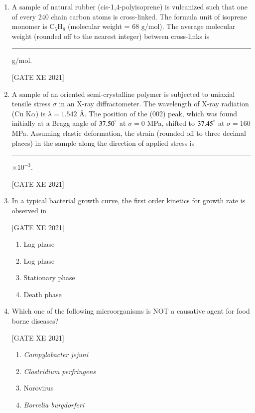 \documentclass[journal,12pt,onecolumn]{IEEEtran}
\theoremstyle{remark}
\begin{document}
\begin{enumerate}[resume]
\hfill[GATE XE 2021]


\item A sample of natural rubber (cis-1,4-polyisoprene) is vulcanized such that one of every 240 chain carbon atoms is cross-linked. The formula unit of isoprene monomer is C$_5$H$_8$ (molecular weight = 68 g/mol). The average molecular weight (rounded off to the nearest integer) between cross-links is \rule{3cm}{0.15mm} g/mol.

\hfill[GATE XE 2021]


\item A sample of an oriented semi-crystalline polymer is subjected to uniaxial tensile stress $\sigma$ in an X-ray diffractometer. The wavelength of X-ray radiation (Cu K$\alpha$) is $\lambda=1.542$ Å. The position of the (002) peak, which was found initially at a Bragg angle of $37.50^\degree$ at $\sigma=0$ MPa, shifted to $37.45^\degree$ at $\sigma=160$ MPa. Assuming elastic deformation, the strain (rounded off to three decimal places) in the sample along the direction of applied stress is \rule{3cm}{0.15mm} $\times10^{-3}$.

\hfill[GATE XE 2021]

\item In a typical bacterial growth curve, the first order kinetics for growth rate is observed in

\hfill[GATE XE 2021]

\begin{multicols}{2}
\begin{enumerate}
\item Lag phase
\item Log phase
\item Stationary phase
\item Death phase
\end{enumerate}
\end{multicols}


\item Which one of the following microorganisms is NOT a causative agent for food borne diseases?

\hfill[GATE XE 2021]

\begin{multicols}{2}
\begin{enumerate}
\item \textit{Campylobacter jejuni}
\item \textit{Clostridium perfringens}
\item Norovirus
\item \textit{Borrelia burgdorferi}
\end{enumerate}
\end{multicols}



\end{enumerate}
\end{document}
